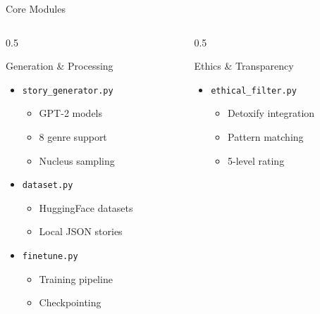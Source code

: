 \documentclass[aspectratio=169]{beamer}
\begin{document}
\begin{frame}{Core Modules}
    \begin{columns}
        \begin{column}{0.5\textwidth}
            \begin{block}{Generation \& Processing}
                \begin{itemize}
                    \item \texttt{story\_generator.py}
                    \begin{itemize}
                        \small
                        \item GPT-2 models
                        \item 8 genre support
                        \item Nucleus sampling
                    \end{itemize}
                    
                    \item \texttt{dataset.py}
                    \begin{itemize}
                        \small
                        \item HuggingFace datasets
                        \item Local JSON stories
                    \end{itemize}
                    
                    \item \texttt{finetune.py}
                    \begin{itemize}
                        \small
                        \item Training pipeline
                        \item Checkpointing
                    \end{itemize}
                \end{itemize}
            \end{block}
        \end{column}
        
        \begin{column}{0.5\textwidth}
            \begin{block}{Ethics \& Transparency}
                \begin{itemize}
                    \item \texttt{ethical\_filter.py}
                    \begin{itemize}
                        \small
                        \item Detoxify integration
                        \item Pattern matching
                        \item 5-level rating
                    \end{itemize}
                    

\end{itemize}
\end{block}
\end{column}
\end{columns}
\end{frame}
\end{document}
